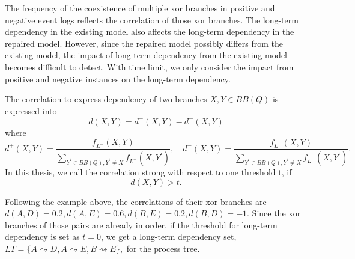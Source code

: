 The frequency of the coexistence of multiple xor branches in positive and negative event logs reflects the correlation of those xor branches. The long-term dependency in the existing model also affects the long-term dependency in the repaired model. However, since the repaired model possibly differs from the existing model, the impact of long-term dependency from the existing model becomes difficult to detect. With time limit, we only consider the impact from positive and negative instances on the long-term dependency.
\begin{definition} The correlation to express dependency of two branches $X,Y \in BB(Q)$ is expressed into
	\[d(X,Y)=  d^{+}(X, Y) -d^{-}(X, Y)\] where 
	\[d^{+}(X, Y)= \frac{f_{L^+}(X, Y)}{\sum_{Y^\prime \in BB(Q), Y^\prime \neq X} f_{L^+}(X, Y^\prime)}, \quad d^{-}(X, Y)= \frac{f_{L^-}(X, Y)}{\sum_{Y^\prime \in BB(Q), Y^\prime \neq X} f_{L^-}(X, Y^\prime)}.\]
In this thesis, we call the correlation strong with respect to one threshold t, if 
\[d(X,Y) > t.\]	
\end{definition}
Following the example above, the correlations of their xor branches are $d(A, D)=0.2,  d(A, E)=0.6, d(B, E)=0.2, d(B, D)=-1$. Since the xor branches of those pairs are already in order, if the threshold for long-term dependency is set as $t=0$, we get a long-term dependency set, $LT=\{ A\rightsquigarrow D, A\rightsquigarrow E, B\rightsquigarrow E\},$ for the process tree.   
